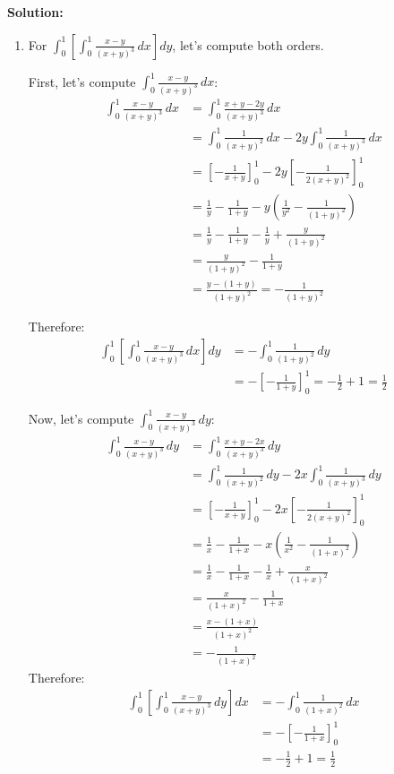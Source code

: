 \bigskip\noindent\textbf{Solution:}
\begin{enumerate}[label=(\alph*)]
\item For $\int_{0}^{1} \left[ \int_{0}^{1} \frac{x - y}{(x + y)^{3}} \, dx \right] dy$, let's compute both orders.

First, let's compute $\int_{0}^{1} \frac{x - y}{(x + y)^{3}} \, dx$:
\begin{align*}
\int_{0}^{1} \frac{x - y}{(x + y)^{3}} \, dx &= \int_{0}^{1} \frac{x + y - 2y}{(x + y)^{3}} \, dx \\
&= \int_{0}^{1} \frac{1}{(x + y)^{2}} \, dx - 2y \int_{0}^{1} \frac{1}{(x + y)^{3}} \, dx \\
&= \left[-\frac{1}{x + y}\right]_{0}^{1} - 2y \left[-\frac{1}{2(x + y)^{2}}\right]_{0}^{1} \\
&= \frac{1}{y} - \frac{1}{1 + y} - y\left(\frac{1}{y^{2}} - \frac{1}{(1 + y)^{2}}\right) \\
&= \frac{1}{y} - \frac{1}{1 + y} - \frac{1}{y} + \frac{y}{(1 + y)^{2}} \\
&= \frac{y}{(1 + y)^{2}} - \frac{1}{1 + y} \\
&= \frac{y - (1 + y)}{(1 + y)^{2}} = -\frac{1}{(1 + y)^{2}}
\end{align*}

Therefore:
\begin{align*}
\int_{0}^{1} \left[ \int_{0}^{1} \frac{x - y}{(x + y)^{3}} \, dx \right] dy &= -\int_{0}^{1} \frac{1}{(1 + y)^{2}} \, dy \\
&= -\left[-\frac{1}{1 + y}\right]_{0}^{1} = -\frac{1}{2} + 1 = \frac{1}{2}
\end{align*}

Now, let's compute $\int_{0}^{1} \frac{x - y}{(x + y)^{3}} \, dy$:
\begin{align*}
\int_{0}^{1} \frac{x - y}{(x + y)^{3}} \, dy &= \int_{0}^{1} \frac{x + y - 2x}{(x + y)^{3}} \, dy \\
&= \int_{0}^{1} \frac{1}{(x + y)^{2}} \, dy - 2x \int_{0}^{1} \frac{1}{(x + y)^{3}} \, dy \\
&= \left[-\frac{1}{x + y}\right]_{0}^{1} - 2x \left[-\frac{1}{2(x + y)^{2}}\right]_{0}^{1} \\
&= \frac{1}{x} - \frac{1}{1 + x} - x\left(\frac{1}{x^{2}} - \frac{1}{(1 + x)^{2}}\right) \\
&= \frac{1}{x} - \frac{1}{1 + x} - \frac{1}{x} + \frac{x}{(1 + x)^{2}} \\
&= \frac{x}{(1 + x)^{2}} - \frac{1}{1 + x} \\
&= \frac{x - (1 + x)}{(1 + x)^{2}} \\
&= -\frac{1}{(1 + x)^{2}}
\end{align*}
Therefore:
\begin{align*}
\int_{0}^{1} \left[ \int_{0}^{1} \frac{x - y}{(x + y)^{3}} \, dy \right] dx &= -\int_{0}^{1} \frac{1}{(1 + x)^{2}} \, dx \\
&= -\left[-\frac{1}{1 + x}\right]_{0}^{1} \\
&= -\frac{1}{2} + 1 = \frac{1}{2}
\end{align*}


\end{enumerate}
